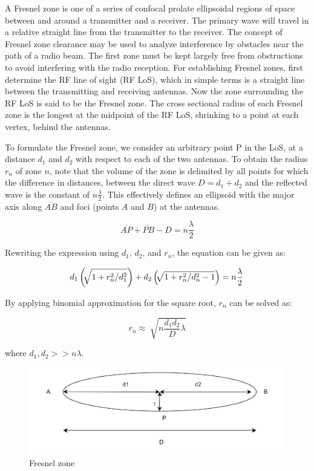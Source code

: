 \documentclass[a4paper,12pt]{report}
\begin{document}
A Fresnel zone is one of a series of confocal prolate ellipsoidal regions
of space between and around a transmitter and a receiver.
The primary wave will travel in a relative straight line from the transmitter to the receiver.
The concept of Fresnel zone clearance may be used to analyze
interference by obstacles near the path of a radio beam.
The first zone must be kept largely free from obstructions to
avoid interfering with the radio reception.
For establishing Fresnel zones, first determine the RF line of sight
(RF LoS), which in simple terms is a straight line
between the transmitting and receiving antennas.
Now the zone surrounding the RF LoS is said to be the Fresnel zone.
The cross sectional radius of each Fresnel zone is the longest
at the midpoint of the RF LoS,
shrinking to a point at each vertex, behind the antennas.

To formulate the Fresnel zone,
we consider an arbitrary point P in the LoS, at a distance $d_1$ and $d_2$
with respect to each of the two antennas.
To obtain the radius $r_n$ of zone $n$,
note that the volume of the zone is delimited by all points
for which the difference in distances,
between the direct wave $D = d_1 + d_2$ and the reflected wave
is the constant of $n\frac{\lambda}{2}$.
This effectively defines an ellipsoid with the major axis along $\overline{AB}$
and foci (points $A$ and $B$) at the antennas.

\begin{equation}
  \overline{AP} + \overline{PB} - D = n\frac{\lambda}{2}
\end{equation}

Rewriting the expression using $d_1$, $d_2$, and $r_n$,
the equation can be given as:

\begin{equation}
  d_1\left(\sqrt[]{1 + r_n^2/d_1^2}\right) + \\
  d_2\left(\sqrt[]{1 + r_n^2/d_n^2 - 1}\right) = n\frac{\lambda}{2}
\end{equation}

By applying binomial approximation for the square root,
$r_n$ can be solved as:

\begin{equation}
  r_n \approx \sqrt[]{n\frac{d_1 d_2}{D}\lambda}
\end{equation}

where $d_1, d_2 >> n\lambda$.

\begin{figure}
  \begin{center}
    \includegraphics[clip, keepaspectratio, width=0.5\linewidth]{img/fresnel_zone.png}
    \caption{Fresnel zone}
    \label{fig:fresnel_zone}
  \end{center}
\end{figure}
\end{document}
